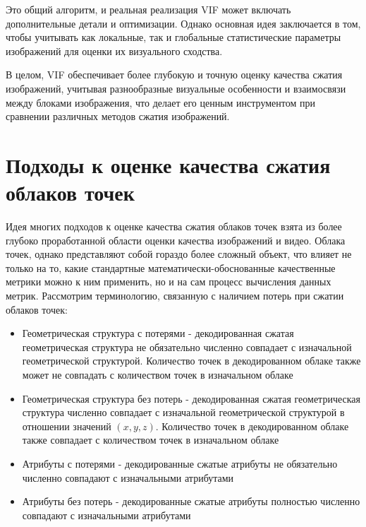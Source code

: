 
Это общий алгоритм, и реальная реализация VIF может включать дополнительные
детали и оптимизации. Однако основная идея заключается в том, чтобы учитывать
как локальные, так и глобальные статистические параметры изображений для оценки
их визуального сходства.


В целом, VIF обеспечивает более глубокую и точную оценку качества сжатия
изображений, учитывая разнообразные визуальные особенности и взаимосвязи между
блоками изображения, что делает его ценным инструментом при сравнении различных
методов сжатия изображений.


\section{Подходы к оценке качества сжатия облаков точек}




Идея многих подходов к оценке качества сжатия облаков точек взята из более
глубоко проработанной области оценки качества изображений и видео. Облака точек,
однако представляют собой гораздо более сложный объект, что влияет не только на
то, какие стандартные математически-обоснованные качественные метрики можно к
ним применить, но и на сам процесс вычисления данных метрик. Рассмотрим
терминологию, связанную с наличием потерь при сжатии облаков
точек\cite{CallForProposalV2}:

\begin{itemize}
    \item Геометрическая структура с потерями - декодированная сжатая
    геометрическая структура не обязательно численно совпадает с изначальной
    геометрической структурой. Количество точек в декодированном облаке также
    может не совпадать с количеством точек в изначальном облаке
    \item Геометрическая структура без потерь - декодированная сжатая
    геометрическая структура численно совпадает с изначальной геометрической
    структурой в отношении значений $\left(x, y, z\right)$. Количество точек в
    декодированном облаке также совпадает с количеством точек в изначальном
    облаке
    \item Атрибуты с потерями - декодированные сжатые атрибуты не обязательно
    численно совпадают с изначальными атрибутами
    \item Атрибуты без потерь - декодированные сжатые атрибуты полностью
    численно совпадают с изначальными атрибутами
\end{itemize}

